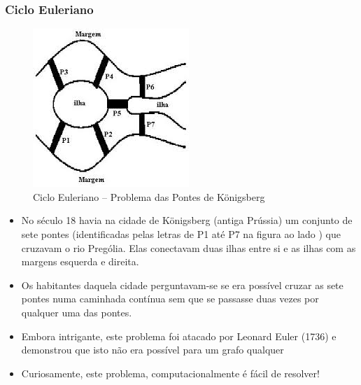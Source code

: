 \begin{frame}[fragile, allowframebreaks=0.9]
  \frametitle{Ciclo Euleriano}


\begin{figure}[!htb]
\centering
\includegraphics[width=.6\textwidth, height=0.650\textheight]{figures/ilhas_euler.jpeg}
\caption{Ciclo Euleriano -- Problema das Pontes de Königsberg}
\end{figure}



\framebreak

\begin{itemize}
  \item No século 18 havia na cidade de Königsberg (antiga Prússia)  um conjunto de sete pontes
 (identificadas pelas letras de P1 até P7 na figura ao lado ) que cruzavam o rio  Prególia. 
 Elas conectavam duas ilhas  entre si e as ilhas com as margens esquerda
 e direita.
 
\item Os habitantes daquela cidade perguntavam-se se era possível cruzar 
as sete pontes numa caminhada contínua sem que se passasse duas vezes por 
qualquer uma das pontes.

\item  Embora intrigante, este problema foi atacado por Leonard Euler (1736) e demonstrou
que isto não era possível para um grafo qualquer

\item Curiosamente, este problema, computacionalmente é fácil de resolver!
\end{itemize}

\end{frame}



